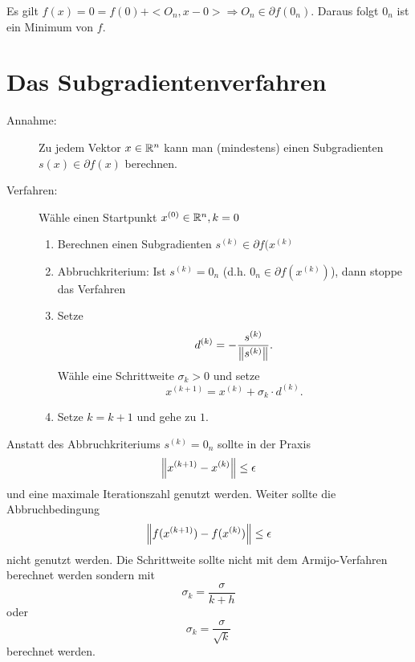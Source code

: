 \begin{Beispiel}[$f(x) = \norm{x}$]
 Es gilt $f(x) = 0 = f(0) + <O_n,x-0>\Rightarrow O_n\in\partial f(0_n)$. Daraus folgt $0_n$ ist ein Minimum von $f$.
\end{Beispiel}

\section{Das Subgradientenverfahren}
\begin{description}
 \item[Annahme:] Zu jedem Vektor $x\in\mathbb R^n$ kann man (mindestens) einen Subgradienten $s(x) \in\partial f(x)$ berechnen.
 \item[Verfahren:] Wähle einen Startpunkt $x^{(0)}\in\mathbb R^n, k=0$
 \begin{enumerate}
  \item Berechnen einen Subgradienten $s^{(k)}\in\partial f(x^{(k)}$
  \item Abbruchkriterium: Ist $s^{(k)} = 0_n$ (d.h. $0_n\in\partial f(x^{(k)})$), dann stoppe das Verfahren
  \item Setze 
  \begin{equation}
   d^{(k)} = -\frac{s^{(k)}}{\left\lVert s^{(k)}\right\rVert}.
  \end{equation}
 Wähle eine Schrittweite $\sigma_k > 0 $  und setze 
 \begin{equation}
  x^{(k+1)} = x^{(k)}+\sigma_k\cdot d^{(k)}.
 \end{equation}
\item Setze $k=k+1$ und gehe zu $1.$
 \end{enumerate}
\end{description}

\begin{Bemerkung}
 Anstatt des Abbruchkriteriums $s^{(k)} = 0_n$ sollte in der Praxis 
 \begin{equation}
 \left\lVert x^{(k+1)}-x^{(k)}\right\rVert\leq \epsilon 
 \end{equation}
 und eine maximale Iterationszahl genutzt werden. Weiter sollte die Abbruchbedingung 
 \begin{equation}
 \left\lVert f(x^{(k+1)})-f(x^{(k)})\right\rVert\leq \epsilon 
 \end{equation}
 nicht genutzt werden. Die Schrittweite sollte nicht mit dem Armijo-Verfahren berechnet werden sondern mit
\begin{equation}
 \sigma_k = \frac{\sigma}{k+h}
\end{equation} 
oder
\begin{equation}
 \sigma_k = \frac{\sigma}{\sqrt k}
\end{equation} 
berechnet werden.
\end{Bemerkung}

